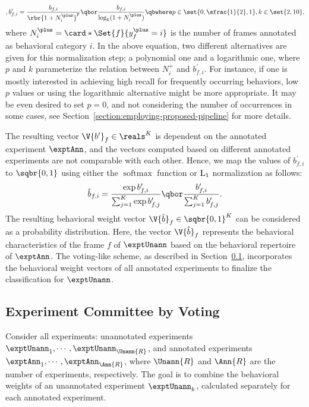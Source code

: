 \begin{equation}\label{equation:behavioral-weight-occurence-normalization},
	b^\prime_{f,i} = \frac{b_{f,i}}{\rbr{1 + N^{\plus}_i}^p} \qbor \frac{b_{f,i}}{\log_k(1 + N^{\plus}_i)} \qbwhere p \in \set{0, \sfrac{1}{2}, 1}, k \in \set{2, 10},
\end{equation}
where $N^{\plus}_i = \card*{\Set{f}{y^{\plus}_f=i}}$ is the number of frames annotated as behavioral category $i$.
In the above equation, two different alternatives are given for this normalization step; a polynomial one and a logarithmic one, where $p$ and $k$ parameterize the relation between $N^{\plus}_i$ and $b^\prime_{f,i}$.
For instance, if one is mostly interested in achieving high recall for frequently occurring behaviors, low $p$ values or using the logarithmic alternative might be more appropriate.
It may be even desired to set $p=0$, and not considering the number of occurrences in some cases, see Section~\ref{section:employing-proposed-pipeline} for more details.

The resulting vector $\V{b^{\prime}}_f \in \reals^K$ is dependent on the annotated experiment $\exptAnn$, and the vectors computed based on different annotated experiments are not comparable with each other.
Hence, we map the values of $b^\prime_{f,i}$ to $\sqbr{0,1}$ using either the $\operatorname {softmax}$ function or $\textnormal{L}_1$ normalization as follows:
\begin{equation}\label{equation:behavioral-weight-activation}
	\hat{b}_{f,i} = \frac{\exp{b^\prime_{f,i}}}{\sum_{j=1}^{K} \exp{b^\prime_{f,j}}} \qbor \frac{b^\prime_{f,i}}{\sum_{j=1}^{K} b^\prime_{f,j}}.
\end{equation}
The resulting behavioral weight vector $\V{\hat{b}}_f \in \sqbr{0,1}^K$ can be considered as a probability distribution.
Here, the vector $\V{\hat{b}}_f$ represents the behavioral characteristics of the frame $f$ of $\exptUnann$ based on the behavioral repertoire of $\exptAnn$.
The voting-like scheme, as described in Section~\ref{section:committee-by-voting}, incorporates the behavioral weight vectors of all annotated experiments to finalize the classification for $\exptUnann$.

\subsection{Experiment Committee by Voting}\label{section:committee-by-voting}
Consider all experiments: unannotated experiments $\exptUnann_1, \cdots, \exptUnann_{\Unann{R}}$, and annotated experiments $\exptAnn_1, \cdots, \exptAnn_{\Ann{R}}$, where $\Unann{R}$ and $\Ann{R}$ are the number of experiments, respectively.
The goal is to combine the behavioral weights of an unannotated experiment $\exptUnann_k$, calculated separately for each annotated experiment.


